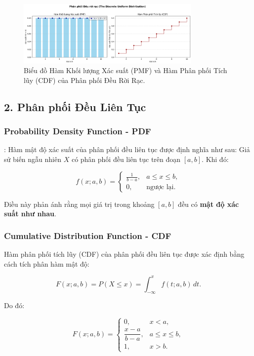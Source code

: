 \begin{figure}[h!]
    \centering
    \includegraphics[width=0.8\textwidth]{images/Uniform_PMF_and_CDF.png}
    \caption{Biểu đồ Hàm Khối lượng Xác suất (PMF) và Hàm Phân phối Tích lũy (CDF) của Phân phối Đều Rời Rạc.}
    \label{fig:uniform_disc_dist}
\end{figure}

\subsection{2. Phân phối Đều Liên Tục}
\subsubsection{Probability Density Function - PDF}:
Hàm mật độ xác suất của phân phối đều liên tục được định nghĩa như sau:  
Giả sử biến ngẫu nhiên \( X \) có phân phối đều liên tục trên đoạn \([a, b]\). Khi đó:

\[
f(x; a, b) =
\begin{cases}
\displaystyle \frac{1}{b - a}, & a \le x \le b, \\[1em]
0, & \text{ngược lại}.
\end{cases}
\]

Điều này phản ánh rằng mọi giá trị trong khoảng \([a, b]\) đều có \textbf{mật độ xác suất như nhau}.


\subsubsection{Cumulative Distribution Function - CDF}

Hàm phân phối tích lũy (CDF) của phân phối đều liên tục được xác định bằng cách tích phân hàm mật độ:

\[
F(x; a, b) = P(X \le x) = \int_{-\infty}^x f(t; a, b)\, dt.
\]

Do đó:

\[
F(x; a, b) =
\begin{cases}
0, & x < a, \\[0.8em]
\dfrac{x - a}{b - a}, & a \le x \le b, \\[1em]
1, & x > b.
\end{cases}
\]


